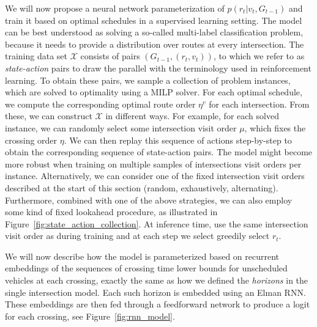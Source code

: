 \documentclass[a4paper]{article}
\theoremstyle{definition}
\theoremstyle{plain}
\begin{document}
We will now propose a neural network parameterization of
$p(r_{t} | v_{t}, G_{t-1})$ and train it based on optimal schedules in a
supervised learning setting. The model can be best understood as solving a
so-called multi-label classification problem, because it needs to provide a
distribution over routes at every intersection.
%
The training data set $\mathcal{X}$ consists of pairs
$(G_{t-1}, (r_{t}, v_{t}))$, to which we refer to as \textit{state-action} pairs
to draw the parallel with the terminology used in reinforcement learning.
%
To obtain these pairs, we sample a collection of problem instances, which are
solved to optimality using a MILP solver. For each optimal schedule, we compute
the corresponding optimal route order $\eta^{v}$ for each intersection.
%
From these, we can construct $\mathcal{X}$ in different ways.
For example, for each solved instance, we can randomly select some intersection
visit order $\mu$, which fixes the crossing order $\eta$. We can then replay
this sequence of actions step-by-step to obtain the corresponding sequence of
state-action pairs.
The model might become more robust when training on multiple samples of
intersections visit orders per instance.
Alternatively, we can consider one of the fixed intersection visit orders
described at the start of this section (random, exhaustively, alternating).
Furthermore, combined with one of the above strategies, we can also employ some
kind of fixed lookahead procedure, as illustrated in
Figure~\ref{fig:state_action_collection}.
At inference time, use the same intersection visit order as during training and
at each step we select greedily select $r_{t}$.

We will now describe how the model is parameterized based on recurrent
embeddings of the sequences of crossing time lower bounds for unscheduled
vehicles at each crossing, exactly the same as how we defined the
\textit{horizons} in the single intersection model. Each such horizon is
embedded using an Elman RNN. These embeddings are then fed through a feedforward
network to produce a logit for each crossing, see Figure~\ref{fig:rnn_model}.


\end{document}

